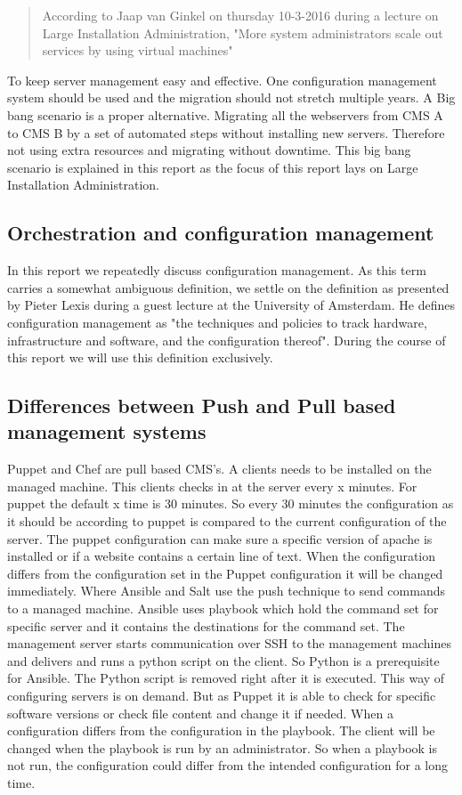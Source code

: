 \begin{quote}
According to Jaap van Ginkel on thursday 10-3-2016 during a lecture on Large Installation Administration, "More system administrators scale out services by using virtual machines"
\end{quote}

To keep server management easy and effective. One configuration management system should be used and the migration should not stretch multiple years. A Big bang scenario is a proper alternative. Migrating all the webservers from CMS A to CMS B by a set of automated steps without installing new servers. Therefore not using extra resources and migrating without downtime. This big bang scenario \cite{bigbang} is explained in this report as the focus of this report lays on Large Installation Administration.


\subsection{Orchestration and configuration management}\label{subsec:orchestration}
In this report we repeatedly discuss configuration management. As this term carries a somewhat ambiguous definition, we settle on the definition as presented by Pieter Lexis during a guest lecture at the University of Amsterdam. He defines configuration management as "the techniques and policies to track hardware, infrastructure and software, and the configuration thereof". During the course of this report we will use this definition exclusively.


\subsection{Differences between Push and Pull based management systems}\label{subsec:pushpull}
Puppet and Chef are pull based CMS's. A clients needs to be installed on the managed machine. This clients checks in at the server every x minutes. For puppet the default x time is 30 minutes. So every 30 minutes the configuration as it should be according to puppet is compared to the current configuration of the server. The puppet configuration can make sure a specific version of apache is installed or if a website contains a certain line of text. When the configuration differs from the configuration set in the Puppet configuration it will be changed immediately. Where Ansible and Salt use the push technique to send commands to a managed machine. Ansible uses playbook which hold the command set for specific server and it contains the destinations for the command set. The management server starts communication over SSH to the management machines and delivers and runs a python script on the client. So Python is a prerequisite for Ansible. The Python script is removed right after it is executed. This way of configuring servers is on demand. But as Puppet it is able to check for specific software versions or check file content and change it if needed. When a configuration differs from the configuration in the playbook. The client will be changed when the playbook is run by an administrator. So when a playbook is not run, the configuration could differ from the intended configuration for a long time. 

